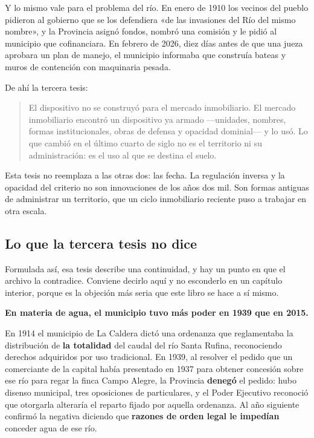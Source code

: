 Y lo mismo vale para el problema del río. En enero de 1910 los vecinos del pueblo pidieron
al gobierno que se los defendiera «de las invasiones del Río del mismo nombre», y la
Provincia asignó fondos, nombró una comisión y le pidió al municipio que cofinanciara. En
febrero de 2026, diez días antes de que una jueza aprobara un plan de manejo, el municipio
informaba que construía bateas y muros de contención con maquinaria pesada.

De ahí la tercera tesis:

\begin{quote}
El dispositivo no se construyó para el mercado inmobiliario. El mercado inmobiliario
encontró un dispositivo ya armado —unidades, nombres, formas institucionales, obras de
defensa y opacidad dominial— y lo usó. Lo que cambió en el último cuarto de siglo no es el
territorio ni su administración: es el uso al que se destina el suelo.
\end{quote}

Esta tesis no reemplaza a las otras dos: las fecha. La regulación inversa y la opacidad del
criterio no son innovaciones de los años dos mil. Son formas antiguas de administrar un
territorio, que un ciclo inmobiliario reciente puso a trabajar en otra escala.

\subsection*{Lo que la tercera tesis no dice}

Formulada así, esa tesis describe una continuidad, y hay un punto en que el archivo la
contradice. Conviene decirlo aquí y no esconderlo en un capítulo interior, porque es la
objeción más seria que este libro se hace a sí mismo.

\textbf{En materia de agua, el municipio tuvo más poder en 1939 que en 2015.}

En 1914 el municipio de La Caldera dictó una ordenanza que reglamentaba la distribución de
\textbf{la totalidad} del caudal del río Santa Rufina, reconociendo derechos adquiridos por
uso tradicional. En 1939, al resolver el pedido que un comerciante de la capital había presentado en 1937 para obtener concesión sobre ese río
para regar la finca Campo Alegre, la Provincia \textbf{denegó} el pedido: hubo disenso
municipal, tres oposiciones de particulares, y el Poder Ejecutivo reconoció que otorgarla
alteraría el reparto fijado por aquella ordenanza. Al año siguiente confirmó la negativa
diciendo que \textbf{razones de orden legal le impedían} conceder agua de ese río.

